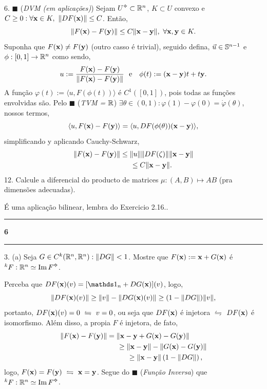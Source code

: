 6. \(\blacksquare\)  (\emph{DVM (em aplicações)}) Sejam \(U\ab\subset \R^n\), \(K \subset U\) convexo e \(C\geq 0 : \forall \x \in K, \ \|DF(\x)\|\leq C\). Então, 
\[\|F(\textbf{x}) - F(\textbf{y})\| \leq C \|\textbf{x}-\textbf{y}\|, \ \forall \textbf{x}, \textbf{y} \in K.\]
\textcolor{gris}{Suponha que \(F(\textbf{x}) \neq F(\textbf{y})\) (outro casso é trivial), seguido defina, \( \vec{u} \in \mathbb{S}^{n-1}  \) e \(\phi: [0,1] \to \mathbb{R}^n\)  como sendo, 
\[u := \frac{F(\textbf{x}) - F(\textbf{y})}{\|F(\textbf{x}) - F(\textbf{y})\|} \text{\ \ e \ \ } \phi(t):= (\textbf{x}-\textbf{y})t + t\textbf{y}.\] 
A função \(\varphi(t) := \langle u, F(\phi (t)) \rangle\) é \(C^1([0,1])\), pois todas as funções envolvidas são. Pelo \(\blacksquare\) (\emph{TVM = \(\mathbb{R}\)}) \(\exists \theta \in (0,1) : \varphi(1) - \varphi(0) = \dot{\varphi}(\theta)\), nossos termos,  
\[\langle u, F(\textbf{x}) - F(\textbf{y})\rangle = \langle u, DF(\phi(\theta))(\textbf{x}-\textbf{y})\rangle,\]
simplificando y aplicando Cauchy-Schwarz, 
\begin{align*}
    \|F(\textbf{x}) - F(\textbf{y})\| &\leq \|u\|\|DF(\zeta)\|\|\textbf{x}-\textbf{y}\|\\
     &\hspace{0.5cm} \leq C\|\textbf{x}-\textbf{y}\|.
\end{align*}
}
12. Calcule a diferencial do producto de matrices \(\mu :(A,B) \mapsto AB\) (pra dimensões adecuadas). 

\textcolor{gris}{É uma aplicação bilinear, lembra do Exercicio 2.16.. }

\-\vspace{-0.3cm}
  {\hrule \vspace{-0.15cm}
  \centering \textbf{6} \vspace{0.1cm}
  \hrule}

3.  (a) Seja \(G \in C^k(\mathbb{R}^n, \mathbb{R}^n): \|DG\|< 1\). Mostre que \(F(\textbf{x}) := \textbf{x} + G(\textbf{x})\) é \(^kF: \R^n\simeq \operatorname{Im} F\ab\).  

\textcolor{gris}{
    Perceba que \(DF(\x)(v) = [\id_n + DG(\x)](v)\), logo, 
    \[\|DF(\textbf{x})(v)\| \geq \|v\| - \|DG(\textbf{x})(v)\| \geq (1 - \|DG\|) \|v\|,\]
    portanto, \(DF(\textbf{x})(v) = 0 \ \leftrightharpoons \ v= 0\), ou seja que \(DF(\textbf{x})\) é injetora \(\leftrightharpoons\) \(DF(\textbf{x})\) é isomorfismo. Além disso, a propia \(F\) é injetora, de fato,   
    \begin{align*}
        \|F(\textbf{x}) -F(\textbf{y}) \| &= \|\textbf{x} - \textbf{y} + G(\textbf{x}) - G(\textbf{y})\| \\
        &\hspace{0.5cm}\geq \|\textbf{x}-\textbf{y}\| - \|G(\textbf{x}) - G(\textbf{y})\| \\ 
        &\hspace{1cm}\geq \|\textbf{x}-\textbf{y}\|\left(1 - \|DG\| \right), 
    \end{align*}
    logo, \(F(\x) = F(\y) \ \leftrightharpoons \ \x=\y\). Segue do \(\blacksquare\) (\emph{Função Inversa}) que \(^kF: \R^n \simeq \operatorname{Im}F\ab\). 
}

